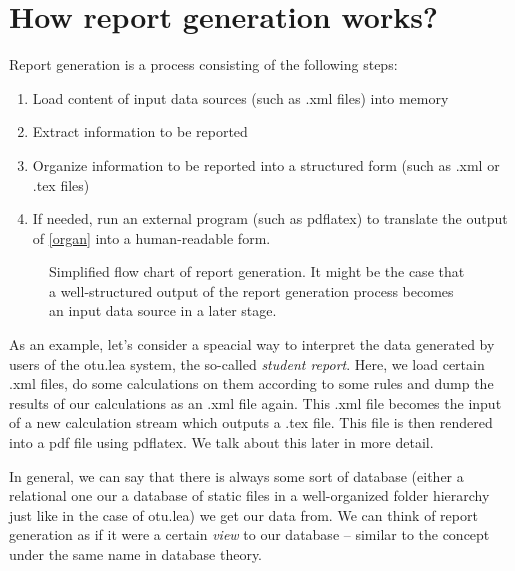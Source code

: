 \documentclass{scrartcl}
\begin{document}
\section{How report generation works?}
Report generation is a process consisting of the following steps:
\begin{enumerate}
\item Load content of input data sources (such as .xml files) into memory
\item Extract information to be reported
\item\label{organ} Organize information to be reported into a structured form (such as .xml or .tex files)
\item If needed, run an external program (such as pdflatex) to translate the output of \ref{organ} into a human-readable form. 
\end{enumerate}
\begin{figure}[t]
\begin{center}
\end{center}
\caption{Simplified flow chart of report generation. It might be the case that a well-structured output of the report generation process becomes an input data source in a later stage.
}
\end{figure}
As an example, let's consider a speacial way to interpret the data generated by users of the otu.lea system, the so-called \emph{student report}. Here, we load certain .xml files, do some calculations on them according to some rules and dump the results of our calculations as an .xml file again. This .xml file becomes the input of a new calculation stream which outputs a .tex file. This file is then rendered into a pdf file using pdflatex. We talk about this later in more detail.

In general, we can say that there is always some sort of database (either a relational one our a database of static files in a well-organized folder hierarchy just like in the case of otu.lea) we get our data from. We can think of report generation as if it were a certain \emph{view} to our database -- similar to the concept under the same name in database theory.
\end{document}
